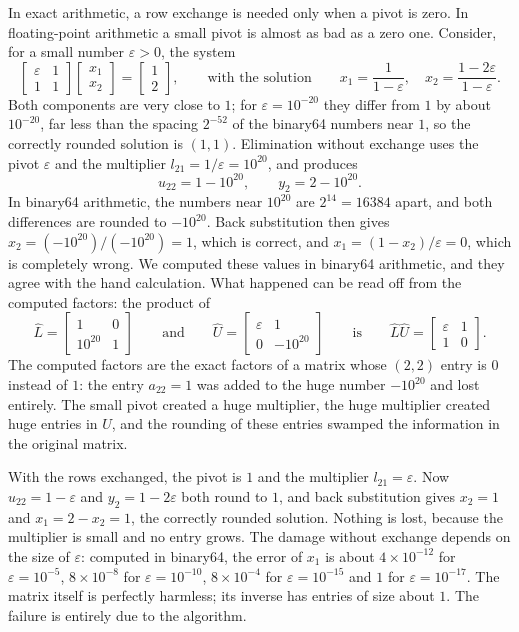 In exact arithmetic, a row exchange is needed only when a pivot is zero. In floating-point arithmetic a small pivot is almost as bad as a zero one. Consider, for a small number $\varepsilon>0$, the system
\[
\begin{bmatrix}\varepsilon&1\\1&1\end{bmatrix}\begin{bmatrix}x_1\\x_2\end{bmatrix}=\begin{bmatrix}1\\2\end{bmatrix},\qquad\text{with the solution}\qquad x_1=\frac1{1-\varepsilon},\quad x_2=\frac{1-2\varepsilon}{1-\varepsilon}.
\]
Both components are very close to $1$; for $\varepsilon=10^{-20}$ they differ from $1$ by about $10^{-20}$, far less than the spacing $2^{-52}$ of the binary64 numbers near $1$, so the correctly rounded solution is $(1,1)$. Elimination without exchange uses the pivot $\varepsilon$ and the multiplier $l_{21}=1/\varepsilon=10^{20}$, and produces
\[
u_{22}=1-10^{20},\qquad y_2=2-10^{20}.
\]
In binary64 arithmetic, the numbers near $10^{20}$ are $2^{14}=16384$ apart, and both differences are rounded to $-10^{20}$. Back substitution then gives $x_2=(-10^{20})/(-10^{20})=1$, which is correct, and $x_1=(1-x_2)/\varepsilon=0$, which is completely wrong. We computed these values in binary64 arithmetic, and they agree with the hand calculation. What happened can be read off from the computed factors: the product of
\[
\hat L=\begin{bmatrix}1&0\\10^{20}&1\end{bmatrix}\qquad\text{and}\qquad\hat U=\begin{bmatrix}\varepsilon&1\\0&-10^{20}\end{bmatrix}\qquad\text{is}\qquad\hat L\hat U=\begin{bmatrix}\varepsilon&1\\1&0\end{bmatrix}.
\]
The computed factors are the exact factors of a matrix whose $(2,2)$ entry is $0$ instead of $1$: the entry $a_{22}=1$ was added to the huge number $-10^{20}$ and lost entirely. The small pivot created a huge multiplier, the huge multiplier created huge entries in $U$, and the rounding of these entries swamped the information in the original matrix.

With the rows exchanged, the pivot is $1$ and the multiplier $l_{21}=\varepsilon$. Now $u_{22}=1-\varepsilon$ and $y_2=1-2\varepsilon$ both round to $1$, and back substitution gives $x_2=1$ and $x_1=2-x_2=1$, the correctly rounded solution. Nothing is lost, because the multiplier is small and no entry grows. The damage without exchange depends on the size of $\varepsilon$: computed in binary64, the error of $x_1$ is about $4\times10^{-12}$ for $\varepsilon=10^{-5}$, $8\times10^{-8}$ for $\varepsilon=10^{-10}$, $8\times10^{-4}$ for $\varepsilon=10^{-15}$ and $1$ for $\varepsilon=10^{-17}$. The matrix itself is perfectly harmless; its inverse has entries of size about $1$. The failure is entirely due to the algorithm.


